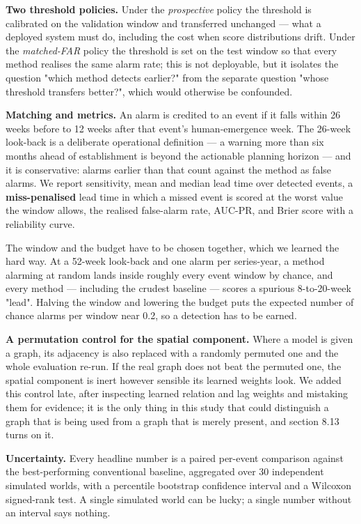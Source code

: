 \documentclass[11pt,a4paper]{article}
\begin{document}
\textbf{Two threshold policies.} Under the \emph{prospective} policy the threshold is calibrated on the validation window and transferred unchanged — what a deployed system must do, including the cost when score distributions drift. Under the \emph{matched-FAR} policy the threshold is set on the test window so that every method realises the same alarm rate; this is not deployable, but it isolates the question "which method detects earlier?" from the separate question "whose threshold transfers better?", which would otherwise be confounded.

\textbf{Matching and metrics.} An alarm is credited to an event if it falls within 26 weeks before to 12 weeks after that event's human-emergence week. The 26-week look-back is a deliberate operational definition — a warning more than six months ahead of establishment is beyond the actionable planning horizon — and it is conservative: alarms earlier than that count against the method as false alarms. We report sensitivity, mean and median lead time over detected events, a \textbf{miss-penalised} lead time in which a missed event is scored at the worst value the window allows, the realised false-alarm rate, AUC-PR, and Brier score with a reliability curve.

The window and the budget have to be chosen together, which we learned the hard way. At a 52-week look-back and one alarm per series-year, a method alarming at random lands inside roughly every event window by chance, and every method — including the crudest baseline — scores a spurious 8-to-20-week "lead". Halving the window and lowering the budget puts the expected number of chance alarms per window near 0.2, so a detection has to be earned.

\textbf{A permutation control for the spatial component.} Where a model is given a graph, its adjacency is also replaced with a randomly permuted one and the whole evaluation re-run. If the real graph does not beat the permuted one, the spatial component is inert however sensible its learned weights look. We added this control late, after inspecting learned relation and lag weights and mistaking them for evidence; it is the only thing in this study that could distinguish a graph that is being used from a graph that is merely present, and section 8.13 turns on it.

\textbf{Uncertainty.} Every headline number is a paired per-event comparison against the best-performing conventional baseline, aggregated over 30 independent simulated worlds, with a percentile bootstrap confidence interval and a Wilcoxon signed-rank test. A single simulated world can be lucky; a single number without an interval says nothing.
\end{document}
